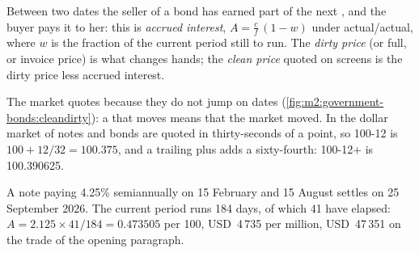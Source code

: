 \begin{definition}\label{def:m2:government-bonds:accrued}
Between two  dates the seller of a bond has earned part of the next
, and the buyer pays it to her: this is \emph{accrued
interest}, $A = \frac{c}{f}\,(1 - w)$ under
actual/actual, where $w$ is the fraction of the current period still to run.
The \emph{dirty price} (or full, or invoice price) is what
changes hands; the \emph{clean price} quoted on screens is
the dirty price less accrued interest.
\end{definition}

The market quotes  because they do not jump on  dates
(\cref{fig:m2:government-bonds:cleandirty}): a  that moves means
that the market moved. In the dollar market  of notes and bonds
are quoted in thirty-seconds of a point, so 100-12 is $100 + 12/32 =
100.375$, and a trailing plus adds a sixty-fourth: 100-12+ is 100.390625.

\begin{example}\label{ex:m2:government-bonds:accrued}
A note paying 4.25\% semiannually on 15 February and 15 August settles on 25
September 2026. The current period runs 184 days, of which 41 have elapsed:
$A = 2.125 \times 41/184 = 0.473505$ per 100, USD~4\,735 per million, USD~47\,351
on the trade of the opening paragraph.
\end{example}


